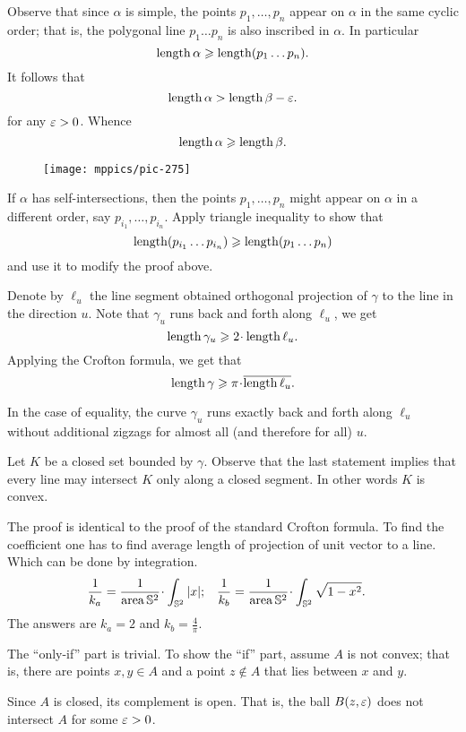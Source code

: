 Observe that since $\alpha$ is simple, the points $p_1,\dots,p_n$ appear on $\alpha$ in the same cyclic order;
that is, the polygonal line $p_1\dots p_n$ is also inscribed in $\alpha$.
In particular 
\[\mathop{\rm length}\nolimits\alpha\geqslant \mathop{\rm length}\nolimits (p_1\dots p_n).\]
It follows that 
\[\mathop{\rm length}\nolimits\alpha>\mathop{\rm length}\nolimits\beta-\varepsilon.\]
for any $\varepsilon>0$.
Whence 
\[\mathop{\rm length}\nolimits\alpha\geqslant\mathop{\rm length}\nolimits\beta.\]

\begin{wrapfigure}{r}{25 mm}
\vskip-0mm
\centering
\texttt{[image: mppics/pic-275]}
\vskip0mm
\end{wrapfigure}

If $\alpha$ has self-intersections, then the points $p_1,\dots, p_n$ might appear on $\alpha$ in a different order, say $p_{i_1},\dots,p_{i_n}$.
Apply triangle inequality to show that 
\[\mathop{\rm length}\nolimits(p_{i_1}\dots p_{i_n})\geqslant \mathop{\rm length}\nolimits (p_1\dots p_n)\]
and use it to modify the proof above.

Denote by $\ell_u$ the line segment 
obtained orthogonal projection of $\gamma$ to the line in the direction $u$.
Note that $\gamma_u$ runs back and forth along $\ell_u$, we get 
\[\length\gamma_u\ge 2\cdot\length\ell_u.\]
Applying the Crofton formula, we get that 
\[\length\gamma\ge \pi\cdot \overline{\length\ell_u}.\]

In the case of equality, the curve $\gamma_u$ runs exactly back and forth along $\ell_u$ without additional zigzags for almost all (and therefore for all) $u$.

Let $K$ be a closed set bounded by $\gamma$.
Observe that the last statement implies that every line may intersect $K$ only along a closed segment.
In other words $K$ is convex.

The proof is identical to the proof of the standard Crofton formula.
To find the coefficient one has to find average length of projection of unit vector to a line.
Which can be done by integration.
\begin{align*}
\frac1{k_a}&=\frac{1}{\area \SS^2}\cdot\int_{\SS^2} |x|;
&
\frac1{k_b}&=\frac{1}{\area \SS^2}\cdot\int_{\SS^2} \sqrt{1-x^2}.
\end{align*}
The answers are $k_a=2$ and $k_b=\tfrac4\pi$.

The ``only-if'' part is trivial.
To show the ``if'' part, assume $A$ is not convex;
that is, there are points $x,y\in A$ and a point $z\notin A$ that lies between $x$ and $y$.

Since $A$ is closed, its complement is open.
That is, the ball $B(z,\varepsilon)$ does not intersect $A$ for some $\varepsilon>0$.

